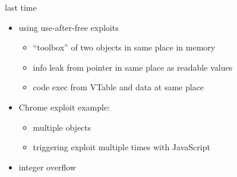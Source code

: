 \date{}
\title{}
\date{}
\usepackage[outputdir=latex.out]{minted}

\begin{frame}
    \titlepage
\end{frame}



\begin{frame}{last time}
    \begin{itemize}
    \item using use-after-free exploits
        \begin{itemize}
        \item ``toolbox'' of two objects in same place in memory
        \item info leak from pointer in same place as readable values
        \item code exec from VTable and data at same place
        \end{itemize}
    \item Chrome exploit example:
        \begin{itemize}
        \item multiple objects
        \item triggering exploit multiple times with JavaScript
        \end{itemize}
    \item integer overflow
    \end{itemize}
\end{frame}

